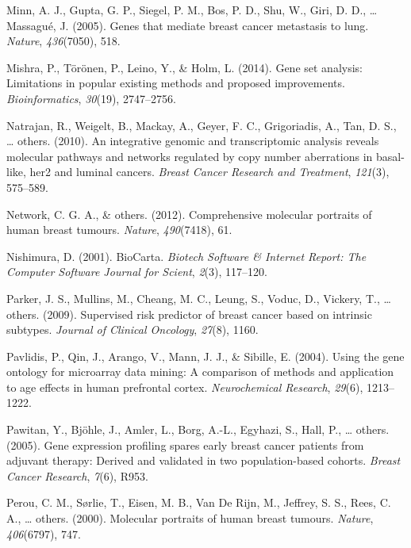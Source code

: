 \documentclass[12pt,twoside]{reedthesis}
\begin{document}
\leavevmode\hypertarget{ref-minn2005genes}{}%
Minn, A. J., Gupta, G. P., Siegel, P. M., Bos, P. D., Shu, W., Giri, D. D., \ldots{} Massagué, J. (2005). Genes that mediate breast cancer metastasis to lung. \emph{Nature}, \emph{436}(7050), 518.

\leavevmode\hypertarget{ref-mishra2014gene}{}%
Mishra, P., Törönen, P., Leino, Y., \& Holm, L. (2014). Gene set analysis: Limitations in popular existing methods and proposed improvements. \emph{Bioinformatics}, \emph{30}(19), 2747--2756.

\leavevmode\hypertarget{ref-natrajan2010integrative}{}%
Natrajan, R., Weigelt, B., Mackay, A., Geyer, F. C., Grigoriadis, A., Tan, D. S., \ldots{} others. (2010). An integrative genomic and transcriptomic analysis reveals molecular pathways and networks regulated by copy number aberrations in basal-like, her2 and luminal cancers. \emph{Breast Cancer Research and Treatment}, \emph{121}(3), 575--589.

\leavevmode\hypertarget{ref-cancer2012comprehensive}{}%
Network, C. G. A., \& others. (2012). Comprehensive molecular portraits of human breast tumours. \emph{Nature}, \emph{490}(7418), 61.

\leavevmode\hypertarget{ref-nishimura2001biocarta}{}%
Nishimura, D. (2001). BioCarta. \emph{Biotech Software \& Internet Report: The Computer Software Journal for Scient}, \emph{2}(3), 117--120.

\leavevmode\hypertarget{ref-parker2009supervised}{}%
Parker, J. S., Mullins, M., Cheang, M. C., Leung, S., Voduc, D., Vickery, T., \ldots{} others. (2009). Supervised risk predictor of breast cancer based on intrinsic subtypes. \emph{Journal of Clinical Oncology}, \emph{27}(8), 1160.

\leavevmode\hypertarget{ref-pavlidis2004using}{}%
Pavlidis, P., Qin, J., Arango, V., Mann, J. J., \& Sibille, E. (2004). Using the gene ontology for microarray data mining: A comparison of methods and application to age effects in human prefrontal cortex. \emph{Neurochemical Research}, \emph{29}(6), 1213--1222.

\leavevmode\hypertarget{ref-pawitan2005gene}{}%
Pawitan, Y., Bjöhle, J., Amler, L., Borg, A.-L., Egyhazi, S., Hall, P., \ldots{} others. (2005). Gene expression profiling spares early breast cancer patients from adjuvant therapy: Derived and validated in two population-based cohorts. \emph{Breast Cancer Research}, \emph{7}(6), R953.

\leavevmode\hypertarget{ref-perou2000molecular}{}%
Perou, C. M., Sørlie, T., Eisen, M. B., Van De Rijn, M., Jeffrey, S. S., Rees, C. A., \ldots{} others. (2000). Molecular portraits of human breast tumours. \emph{Nature}, \emph{406}(6797), 747.
\end{document}
